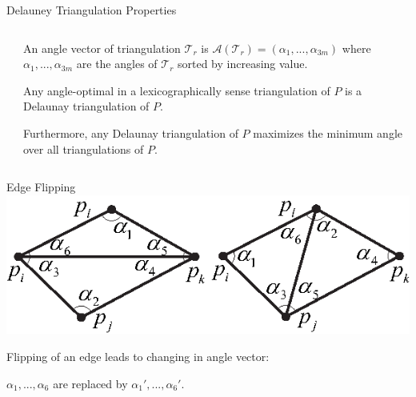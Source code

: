 \documentclass[10pt]{beamer}
\begin{document}
\begin{frame}{Delauney Triangulation Properties}
\begin{columns}
	\begin{column}{0.4\textwidth} 
		\end{column}
	\begin{column}{0.6\textwidth}
		An \alert{angle vector} of triangulation 
		$\mathcal{T}_r$ is $\mathcal{A}(\mathcal{T}_r)=(\alpha_1,...,\alpha_{3m})$
		where $\alpha_1,...,\alpha_{3m}$ are the angles of $\mathcal{T}_r$ 
		sorted by increasing value.
		\bigskip
			
		Any angle-optimal in a \alert{lexicographically} sense triangulation of $P$ 
		is a Delaunay triangulation of $P$.
		\bigskip
		
		Furthermore, any Delaunay triangulation of $P$ maximizes the minimum angle
		over all triangulations of $P$.
	\end{column}
\end{columns}
\end{frame}

\begin{frame}{Edge Flipping}
\includegraphics[width=\linewidth]{img/flip_triangle.eps}
	
	Flipping of an edge leads to changing in angle vector:
	
	$\alpha_1,...,\alpha_6$ are replaced by $\alpha_1',...,\alpha_6'$.

\end{frame}
\end{document}
